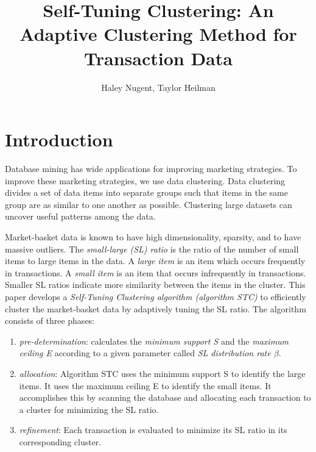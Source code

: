 \documentclass[11pt,reqno]{amsart}
\theoremstyle{definition}
\numberwithin{equation}{subsection}
\begin{document}
\title{Self-Tuning Clustering: An Adaptive Clustering Method for Transaction Data}

\author{Haley Nugent, Taylor Heilman}


\maketitle

\section{Introduction}

Database mining has wide applications for improving marketing strategies. To improve these marketing strategies, we use data clustering. Data clustering divides a set of data items into separate groups such that items in the same group are as similar to one another as possible. Clustering large datasets can uncover useful patterns among the data. 

Market-basket data is known to have high dimensionality, sparsity, and to have massive outliers. The {\em small-large (SL) ratio} is the ratio of the number of small items to large items in the data. A {\em large item} is an item which occurs frequently in transactions. A {\em small item} is an item that occurs infrequently in transactions. Smaller SL ratios indicate more similarity between the items in the cluster. This paper develops a {\em Self-Tuning Clustering algorithm (algorithm STC)} to efficiently cluster the market-basket data by adaptively tuning the SL ratio. The algorithm consists of three phases:
	\begin{enumerate}
		\item {\em pre-determination}: calculates the {\em minimum support S} and the {\em maximum ceiling E} according to a given parameter called {\em SL distribution rate $\beta$}.
		
		\item {\em allocation}: Algorithm STC uses the minimum support S to identify the large items. It uses the maximum ceiling E to identify the small items. It accomplishes this by scanning the database and allocating each transaction to a cluster for minimizing the SL ratio.
		
		\item {\em refinement}: Each transaction is evaluated to minimize its SL ratio in its corresponding cluster. 
	\end{enumerate}
	
\end{document}
